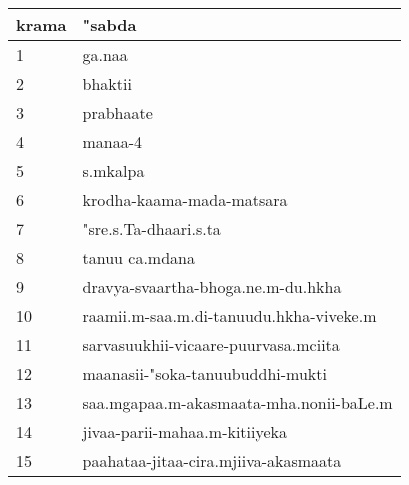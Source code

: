 \documentclass[a6paper]{article}
\begin{document}
\begin{tabular}{|l|l|}
\hline
krama & "sabda\\
\hline
1 & ga.naa \\
\hline
2 & bhaktii \\
\hline
3 & prabhaate \\
\hline
4 & manaa-4 \\
\hline
5 & s.mkalpa \\
\hline
6 & krodha-kaama-mada-matsara \\
\hline
7 & "sre.s.Ta-dhaari.s.ta \\
\hline
8 & tanuu ca.mdana\\
\hline
9 & dravya-svaartha-bhoga.ne.m-du.hkha\\
\hline
10 & raamii.m-saa.m.di-tanuudu.hkha-viveke.m\\
\hline
11 & sarvasuukhii-vicaare-puurvasa.mciita\\
\hline
12 & maanasii-"soka-tanuubuddhi-mukti\\
\hline
13 & saa.mgapaa.m-akasmaata-mha.nonii-baLe.m\\
\hline
14 & jivaa-parii-mahaa.m-kitiiyeka\\
\hline
15 & paahataa-jitaa-cira.mjiiva-akasmaata\\
\hline
\end{tabular}
        
\end{document}
